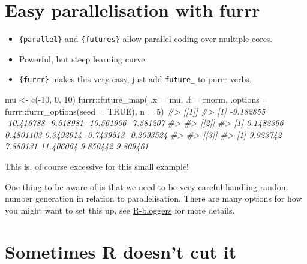 \documentclass[
  12pt,
]{book}
\newenvironment{Shaded}{\begin{snugshade}}{\end{snugshade}}
\newcommand{\AttributeTok}[1]{\textcolor[rgb]{0.77,0.63,0.00}{#1}}
\newcommand{\CommentTok}[1]{\textcolor[rgb]{0.56,0.35,0.01}{\textit{#1}}}
\newcommand{\ConstantTok}[1]{\textcolor[rgb]{0.00,0.00,0.00}{#1}}
\newcommand{\DecValTok}[1]{\textcolor[rgb]{0.00,0.00,0.81}{#1}}
\newcommand{\FunctionTok}[1]{\textcolor[rgb]{0.00,0.00,0.00}{#1}}
\newcommand{\NormalTok}[1]{#1}
\newcommand{\OtherTok}[1]{\textcolor[rgb]{0.56,0.35,0.01}{#1}}
\newcommand{\SpecialCharTok}[1]{\textcolor[rgb]{0.00,0.00,0.00}{#1}}
\begin{document}
\hypertarget{easy-parallelisation-with-furrr}{%
\section{Easy parallelisation with furrr}\label{easy-parallelisation-with-furrr}}

\begin{itemize}
\item
  \texttt{\{parallel\}} and \texttt{\{futures\}} allow parallel coding over multiple cores.
\item
  Powerful, but steep learning curve.
\item
  \texttt{\{furrr\}} makes this very easy, just add \texttt{future\_} to purrr verbs.
\end{itemize}

\begin{Shaded}
\begin{Highlighting}[]
\NormalTok{mu }\OtherTok{\textless{}{-}} \FunctionTok{c}\NormalTok{(}\SpecialCharTok{{-}}\DecValTok{10}\NormalTok{, }\DecValTok{0}\NormalTok{, }\DecValTok{10}\NormalTok{)}
\NormalTok{furrr}\SpecialCharTok{::}\FunctionTok{future\_map}\NormalTok{(}
  \AttributeTok{.x =}\NormalTok{ mu, }
  \AttributeTok{.f =}\NormalTok{ rnorm,}
  \AttributeTok{.options =}\NormalTok{ furrr}\SpecialCharTok{::}\FunctionTok{furrr\_options}\NormalTok{(}\AttributeTok{seed =} \ConstantTok{TRUE}\NormalTok{),}
  \AttributeTok{n =} \DecValTok{5}\NormalTok{) }
\CommentTok{\#\textgreater{} [[1]]}
\CommentTok{\#\textgreater{} [1]  {-}9.182855 {-}10.416788  {-}9.518981 {-}10.561906  {-}7.581207}
\CommentTok{\#\textgreater{} }
\CommentTok{\#\textgreater{} [[2]]}
\CommentTok{\#\textgreater{} [1]  0.1482396  0.4801103  0.3492914 {-}0.7439513 {-}0.2093524}
\CommentTok{\#\textgreater{} }
\CommentTok{\#\textgreater{} [[3]]}
\CommentTok{\#\textgreater{} [1]  9.923742  7.880131 11.406064  9.850442  9.809461}
\end{Highlighting}
\end{Shaded}

This is, of course excessive for this small example!

One thing to be aware of is that we need to be very careful handling random number generation in relation to parallelisation. There are many options for how you might want to set this up, see \href{https://www.r-bloggers.com/2020/09/future-1-19-1-making-sure-proper-random-numbers-are-produced-in-parallel-processing/}{R-bloggers} for more details.

\hypertarget{sometimes-r-doesnt-cut-it}{%
\section{Sometimes R doesn't cut it}\label{sometimes-r-doesnt-cut-it}}
\end{document}
